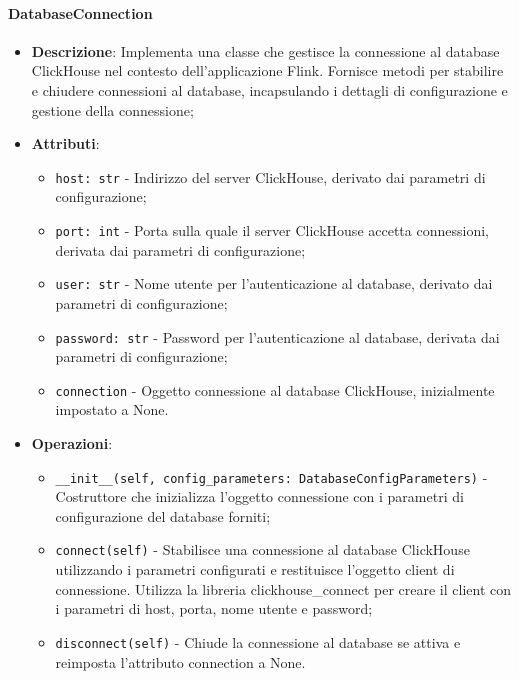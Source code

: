 \documentclass[10pt]{article}
\begin{document}
    \paragraph{DatabaseConnection}
    \begin{itemize} 
    \item \textbf{Descrizione}: Implementa una classe che gestisce la connessione al database ClickHouse nel contesto dell'applicazione Flink. Fornisce metodi per stabilire e chiudere connessioni al database, incapsulando i dettagli di configurazione e gestione della connessione;
    \item \textbf{Attributi}:
    \begin{itemize}
        \item \texttt{host: str} - Indirizzo del server ClickHouse, derivato dai parametri di configurazione;
        \item \texttt{port: int} - Porta sulla quale il server ClickHouse accetta connessioni, derivata dai parametri di configurazione;
        \item \texttt{user: str} - Nome utente per l'autenticazione al database, derivato dai parametri di configurazione;
        \item \texttt{password: str} - Password per l'autenticazione al database, derivata dai parametri di configurazione;
        \item \texttt{connection} - Oggetto connessione al database ClickHouse, inizialmente impostato a None.
    \end{itemize}
    
    \item \textbf{Operazioni}:
    \begin{itemize}
        \item \texttt{\_\_init\_\_(self, config\_parameters: DatabaseConfigParameters)} - Costruttore che inizializza l'oggetto connessione con i parametri di configurazione del database forniti;
        
        \item \texttt{connect(self)} - Stabilisce una connessione al database ClickHouse utilizzando i parametri configurati e restituisce l'oggetto client di connessione. Utilizza la libreria clickhouse\_connect per creare il client con i parametri di host, porta, nome utente e password;
        
        \item \texttt{disconnect(self)} - Chiude la connessione al database se attiva e reimposta l'attributo connection a None.
    \end{itemize}
    \end{itemize}
\end{document}
